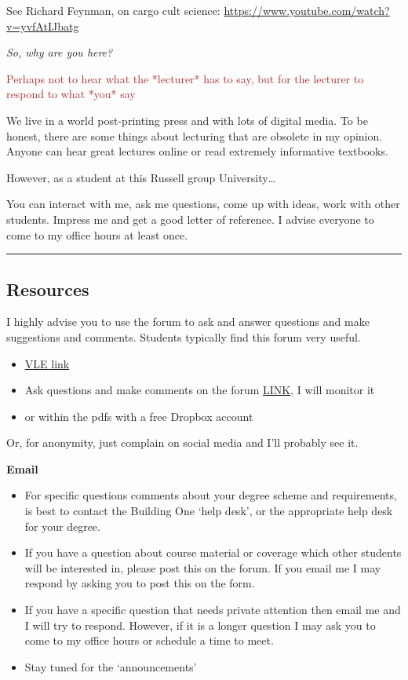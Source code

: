 \documentclass[]{article}
\begin{document}
See Richard Feynman, on cargo cult science:
\url{https://www.youtube.com/watch?v=yvfAtIJbatg}

\emph{So, why are you here?}

\textcolor{brown}{Perhaps not to hear what the *lecturer* has to say, but for the lecturer to respond to what *you* say}

We live in a world post-printing press and with lots of digital media.
To be honest, there are some things about lecturing that are obsolete in
my opinion. Anyone can hear great lectures online or read extremely
informative textbooks.

However, as a student at this Russell group University\ldots{}

You can interact with me, ask me questions, come up with ideas, work
with other students. Impress me and get a good letter of reference. I
advise everyone to come to my office hours at least once.

\begin{center}\rule{0.5\linewidth}{\linethickness}\end{center}

\hypertarget{resources}{%
\subsection{Resources}\label{resources}}

I highly advise you to use the forum to ask and answer questions and
make suggestions and comments. Students typically find this forum very
useful.

\begin{itemize}
\item
  \href{http://vle.exeter.ac.uk/course/view.php?id=1847}{VLE link}
\item
  Ask questions and make comments on the forum
  \href{http://vle.exeter.ac.uk/mod/forum/view.php?id=487174}{LINK}, I
  will monitor it
\item
  or within the pdfs with a free Dropbox account
\end{itemize}

Or, for anonymity, just complain on social media and I'll probably see
it.

\textbf{Email}

\begin{itemize}
\item
  For specific questions comments about your degree scheme and
  requirements, is best to contact the Building One `help desk', or the
  appropriate help desk for your degree.
\item
  If you have a question about course material or coverage which other
  students will be interested in, please post this on the forum. If you
  email me I may respond by asking you to post this on the form.
\item
  If you have a specific question that needs private attention then
  email me and I will try to respond. However, if it is a longer
  question I may ask you to come to my office hours or schedule a time
  to meet.
\item
  Stay tuned for the `announcements'
\end{itemize}
\end{document}

